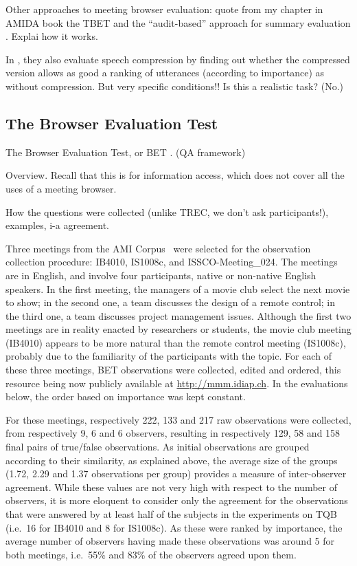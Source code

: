 \documentclass[11pt]{article}
\begin{document}
Other approaches to meeting browser evaluation: quote from my chapter in AMIDA book the TBET \cite{post-hcii07} and the ``audit-based'' approach for summary evaluation  \cite{summeval-mlmi08}.  Explai how it works.   

In \cite{whittaker-puc08}, they also evaluate speech compression by finding out whether the compressed version allows as good a ranking of utterances (according to importance) as without compression.  But very specific conditions!! Is this a realistic task? (No.)


\subsection{The Browser Evaluation Test}

The Browser Evaluation Test, or BET \cite{wellner-chi05,popescubelis-mlmi07}.  (QA framework) 

Overview.  Recall that this is for information access, which does not cover all the uses of a meeting browser. 

How the questions were collected (unlike TREC, we don't ask participants!), examples, i-a agreement.

Three meetings from the AMI Corpus~\cite{car06} were selected for the observation collection procedure: IB4010, IS1008c, and ISSCO-Meeting\_024.  The meetings are in English, and involve four participants, native or non-native English speakers.  In the first meeting, the managers of a movie club select the next movie to show; in the second one, a team discusses the design of a remote control; in the third one, a team discusses project management issues.  Although the first two meetings are in reality enacted by researchers or students, the movie club meeting (IB4010) appears to be more natural than the remote control meeting (IS1008c), probably due to the familiarity of the participants with the topic.  For each of these three meetings, BET observations were collected, edited and ordered, this resource being now publicly available at \url{http://mmm.idiap.ch}.  In the evaluations below, the order based on importance was kept constant.

For these meetings, respectively 222, 133 and 217 raw observations were collected, from respectively 9, 6 and 6 observers, resulting in respectively 129, 58 and 158 final pairs of true/false observations.  As initial observations are grouped according to their similarity, as explained above, the average size of the groups (1.72, 2.29 and 1.37 observations per group) provides a measure of inter-observer agreement.  While these values are not very high with respect to the number of observers, it is more eloquent to consider only the agreement for the observations that were answered by at least half of the subjects in the experiments on TQB (i.e.\ 16 for IB4010 and 8 for IS1008c).  As these were ranked by importance, the average number of observers having made these observations was around 5 for both meetings, i.e.\ 55\% and 83\% of the observers agreed upon them.
\end{document}
